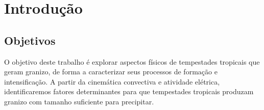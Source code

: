 \chapter{Introdução}

\section{Objetivos}

O objetivo deste trabalho é explorar aspectos físicos de tempestades tropicais que geram granizo, de forma a caracterizar seus processos de formação e intensificação. A partir da cinemática convectiva e atividade elétrica, identificaremos fatores determinantes para que tempestades tropicais produzam granizo com tamanho suficiente para precipitar.
